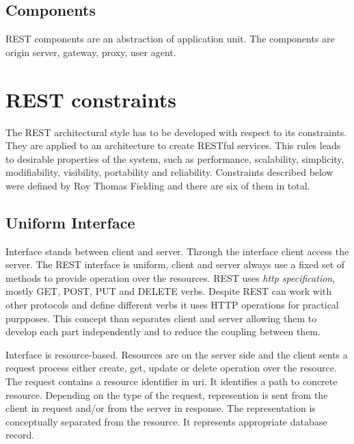 \subsection{Components}
REST components are an abstraction of application unit. The components are origin server, gateway, proxy, user agent. %

\section{REST constraints}
\label{sec:constraints}

The REST architectural style has to be developed with respect to its constraints. They are applied to an architecture to create RESTful services. This rules leads to desirable properties of the system, such as performance, scalability, simplicity, modifiability, visibility, portability and reliability. Constraints described below were defined by Roy Thomas Fielding and there are six of them in total.
 

\subsection{Uniform Interface}
  
Interface stands between client and server. Through the interface client access the server. The REST interface is uniform, client and server always use a fixed set of methods to provide operation over the resources. REST uses \emph{\gls{http} specification}, mostly GET, POST, PUT and DELETE verbs. Despite REST can work with other protocols and define different verbs it uses HTTP operations for practical purpposes. This concept than separates client and server allowing them to develop each part independently and to reduce the coupling between them. %

Interface is resource-based. Resources are on the server side and the client sents a request process either create, get, update or delete operation over the resource. The request contains a resource identifier in \gls{uri}. It identifies a path to concrete resource. Depending on the type of the request, represention is sent from the client in request and/or from the server in response. The representation is conceptually separated from the resource. It represents appropriate database record.

